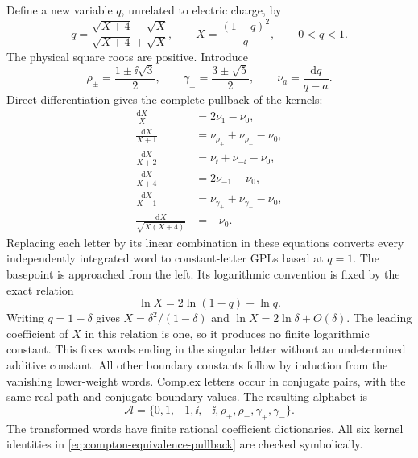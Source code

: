 Define a new variable $q$, unrelated to electric charge, by
\begin{equation}
 q=\frac{\sqrt{X+4}-\sqrt X}{\sqrt{X+4}+\sqrt X},\qquad
 X=\frac{(1-q)^2}{q},\qquad 0<q<1.
\end{equation}
The physical square roots are positive.  Introduce
\begin{equation}
 \rho_\pm=\frac{1\pm\ii\sqrt3}{2},\qquad
 \gamma_\pm=\frac{3\pm\sqrt5}{2},\qquad
 \nu_a=\frac{\mathrm{d}q}{q-a}.
\end{equation}
Direct differentiation gives the complete pullback of the kernels:
\begin{align}
 \frac{\mathrm{d}X}{X}&=2\nu_1-\nu_0,\\
 \frac{\mathrm{d}X}{X+1}&=\nu_{\rho_+}+\nu_{\rho_-}-\nu_0,\\
 \frac{\mathrm{d}X}{X+2}&=\nu_{\ii}+\nu_{-\ii}-\nu_0,\\
 \frac{\mathrm{d}X}{X+4}&=2\nu_{-1}-\nu_0,\\
 \frac{\mathrm{d}X}{X-1}&=\nu_{\gamma_+}+\nu_{\gamma_-}-\nu_0,\\
 \frac{\mathrm{d}X}{\sqrt{X(X+4)}}&=-\nu_0.
 \label{eq:compton-equivalence-pullback}
\end{align}
Replacing each letter by its linear combination in these equations
converts every independently integrated word to constant-letter GPLs based at $q=1$.
The basepoint is approached from the left.  Its logarithmic convention
is fixed by the exact relation
\begin{equation}
 \ln X=2\ln(1-q)-\ln q.
\end{equation}
Writing $q=1-\delta$ gives $X=\delta^2/(1-\delta)$ and
$\ln X=2\ln\delta+O(\delta)$.  The leading coefficient of
$X$ in this relation is one, so it produces no finite logarithmic
constant.  This fixes words ending in the singular letter without an
undetermined additive constant.  All other boundary constants follow
by induction from the vanishing lower-weight words.  Complex letters
occur in conjugate pairs, with the same real path and conjugate boundary
values.  The resulting alphabet is
\begin{equation}
 \mathcal A=\{0,1,-1,\ii,-\ii,\rho_+,\rho_-,\gamma_+,\gamma_-\}.
\end{equation}
The transformed words have finite rational coefficient dictionaries.
All six kernel identities
in \eqref{eq:compton-equivalence-pullback} are checked symbolically.

